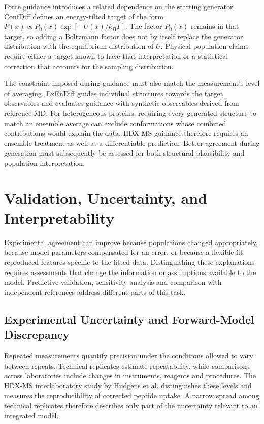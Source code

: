 Force guidance introduces a related dependence on the starting generator. ConfDiff defines an energy-tilted target of the form $P(x)\propto P_0(x)\exp[-U(x)/k_BT]$.\supercite{wangProteinConformationGeneration2024} The factor $P_0(x)$ remains in that target, so adding a Boltzmann factor does not by itself replace the generator distribution with the equilibrium distribution of $U$. Physical population claims require either a target known to have that interpretation or a statistical correction that accounts for the sampling distribution.

The constraint imposed during guidance must also match the measurement's level of averaging. ExEnDiff guides individual structures towards the target observables and evaluates guidance with synthetic observables derived from reference MD.\supercite{liuExEnDiffExperimentGuidedDiffusion2025} For heterogeneous proteins, requiring every generated structure to match an ensemble average can exclude conformations whose combined contributions would explain the data. HDX-MS guidance therefore requires an ensemble treatment as well as a differentiable prediction. Better agreement during generation must subsequently be assessed for both structural plausibility and population interpretation.

\section{Validation, Uncertainty, and Interpretability}
\label{sec:bg-validation}

Experimental agreement can improve because populations changed appropriately, because model parameters compensated for an error, or because a flexible fit reproduced features specific to the fitted data. Distinguishing these explanations requires assessments that change the information or assumptions available to the model. Predictive validation, sensitivity analysis and comparison with independent references address different parts of this task.\supercite{bonomiPrinciplesProteinStructural2017,siddiquiFrameworkTestingStructural2026}

\subsection{Experimental Uncertainty and Forward-Model Discrepancy}
\label{sec:bg-uncertainty}

Repeated measurements quantify precision under the conditions allowed to vary between repeats. Technical replicates estimate repeatability, while comparisons across laboratories include changes in instruments, reagents and procedures. The HDX-MS interlaboratory study by Hudgens et al. distinguishes these levels and measures the reproducibility of corrected peptide uptake.\supercite{hudgensInterlaboratoryComparisonHydrogenDeuterium2019} A narrow spread among technical replicates therefore describes only part of the uncertainty relevant to an integrated model.

